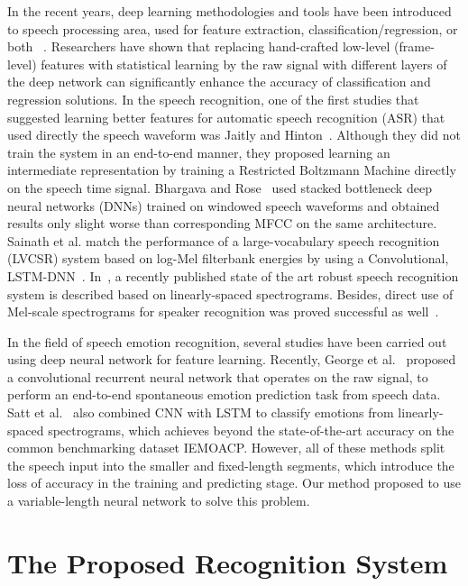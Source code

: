 \documentclass[a4paper]{article}
\begin{document}
In the recent years, deep learning methodologies and tools have been introduced to speech processing area, used for feature extraction, classification/regression, or both ~\cite{han2014, lee2015, huang2014, le2013, rana2016, chernykh2017}. Researchers have shown that replacing hand-crafted low-level (frame-level) features with statistical learning by the raw signal with different layers of the deep network can significantly enhance the accuracy of classification and regression solutions. In the speech recognition, one of the first studies that suggested learning better features for automatic speech recognition (ASR) that used directly the speech waveform was Jaitly and Hinton~\cite{jaitly2012}. Although they did not train the system in an end-to-end manner, they proposed learning an intermediate representation by training a Restricted Boltzmann Machine directly on the speech time signal. Bhargava and Rose~\cite{bhargava2015} used stacked bottleneck deep neural networks (DNNs) trained on windowed speech waveforms and obtained results only slight worse than corresponding MFCC on the same architecture. Sainath et al. match the performance of a large-vocabulary speech recognition (LVCSR) system based on log-Mel filterbank energies by using a Convolutional, LSTM-DNN~\cite{sainath2015a, sainath2015b}. In~\cite{hannun2014, amodei2015}, a recently published state of the art robust speech recognition system is described based on linearly-spaced spectrograms. Besides, direct use of Mel-scale spectrograms for speaker recognition was proved successful as well~\cite{variani2014}.

In the field of speech emotion recognition, several studies have been carried out using deep neural network for feature learning. Recently, George et al.~\cite{trigeorgis2016} proposed a convolutional recurrent neural network that operates on the raw signal, to perform an end-to-end spontaneous emotion prediction task from speech data. Satt et al.~\cite{satt2017} also combined CNN with LSTM to classify emotions from linearly-spaced spectrograms, which achieves beyond the state-of-the-art accuracy on the common benchmarking dataset IEMOACP. However, all of these methods split the speech input into the smaller and fixed-length segments, which introduce the loss of accuracy in the training and predicting stage. Our method proposed to use a variable-length neural network to solve this problem.

\section{The Proposed Recognition System}
\label{sec:recognition_system}
\end{document}
